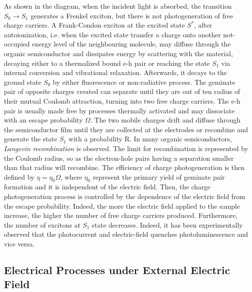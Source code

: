 \documentclass  [
  paper    = a4,
  BCOR     = 10mm,
  twoside,
  fontsize = 12pt,
  fleqn,
  toc      = bibnumbered,
  toc      = listofnumbered,
  numbers  = noendperiod,
  headings = normal,
  listof   = leveldown,
  version  = 3.03
]                                       {scrreprt}
\begin{document}
As shown in the diagram, when the incident light is absorbed, the transition $S_0\rightarrow S_1$ generates a Frenkel exciton, but there is not photogeneration of free charge carriers. A Frank-Condon exciton at the excited state $S^*$, after autoionization, i.e. when the excited state transfer a charge onto another not-occupied energy level of the neighbouring molecule, may diffuse through the organic semiconductor and dissipates energy by scattering with the material, decaying either to a thermalized bound e-h pair or reaching the state $S_1$ via internal conversion and vibrational relaxation. Afterwards, it decays to the ground state $S_0$ by either fluorescence or non-radiative process. The geminate pair of opposite charges created can separate until they are out of ten radius of their mutual Coulomb attraction, turning into two free charge carriers. The e-h pair is usually made free by processes thermally activated and may dissociate with an escape probability $\Omega$. The two mobile charges drift and diffuse through the semiconductor film until they are collected at the electrodes or recombine and generate the state $S_1$ with a probability R. In many organic semiconductors, \emph{Langevin recombination} is observed. The limit for recombination is represented by the Coulomb radius, so as the electron-hole pairs having a separation smaller than that radius will recombine. The efficiency of charge photogeneration is then defined by $\eta=\eta_0\Omega$, where $\eta_0$ represent the primary yield of geminate pair formation and it is independent of the electric field. Then, the charge photogeneration process is controlled by the dependence of the electric field from the escape probability. Indeed, the more the electric field applied to the sample increase, the higher the number of free charge carriers produced. Furthermore, the number of excitons at $S_1$ state decreases. Indeed, it has been experimentally observed that the photocurrent and electric-field quenches photoluminescence and vice versa\cite{ref:onsager}.

	\subsection{Electrical Processes under External Electric Field}\label{sec:electrical}
\end{document}
